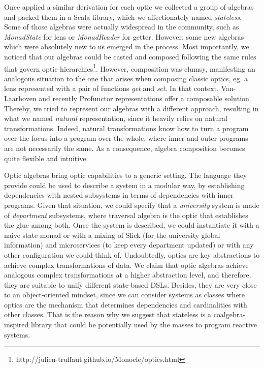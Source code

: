\documentclass[a4paper]{report}
\begin{document}
Once applied a similar derivation for each optic we collected a group of
algebras and packed them in a Scala library, which we affectionately named
\emph{stateless}. Some of those algebras were actually widespread in the
community, such as \emph{MonadState} for lens or \emph{MonadReader} for getter.
However, some new algebras which were absolutely new to us emerged in the
process. Most importantly, we noticed that our algebras could be casted and
composed following the same rules that govern optic
hierarchies\footnote{http://julien-truffaut.github.io/Monocle/optics.html}.
However, composition was clumsy, manifesting an analogous situation to the one
that arises when composing classic optics, eg. a lens represented with a pair of
functions \emph{get} and \emph{set}. In that context, Van-Laarhoven and recently
Profunctor representations offer a composable solution. Thereby, we tried to
represent our algebras with a different approach, resulting in what we named
\emph{natural} representation, since it heavily relies on natural
transformations. Indeed, natural transformations know how to turn a program over
the focus into a program over the whole, where inner and outer programs are not
necessarily the same. As a consequence, algebra composition becomes quite
flexible and intuitive.


Optic algebras bring optic capabilities to a generic setting. The language they
provide could be used to describe a system in a modular way, by establishing
dependencies with nested subsystems in terms of dependencies with inner
programs. Given that situation, we could specify that a \emph{university} system
is made of \emph{department} subsystems, where traversal algebra is the optic
that establishes the glue among both. Once the system is described, we could
instantiate it with a naive state monad or with a mixing of Slick (for the
university global information) and microservices (to keep every department
updated) or with any other configuration we could think of. Undoubtedly, optics
are key abstractions to achieve complex transformations of data. We claim that
optic algebras achieve analogous complex transformations at a higher abstraction
level, and therefore, they are suitable to unify different state-based DSLs.
Besides, they are very close to an object-oriented mindset, since we can
consider systems as classes where optics are the mechanism that determines
dependencies and cardinalities with other classes. That is the reason why we
suggest that stateless is a coalgebra-inspired library that could be potentially
used by the masses to program reactive systems.
\end{document}
